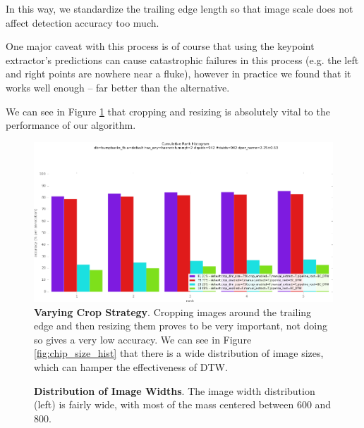 In this way, we standardize the trailing edge length so that image scale does not affect detection accuracy too much.

One major caveat with this process is of course that using the keypoint extractor's predictions can cause catastrophic failures in this process (e.g. the left and right points are nowhere near a fluke), however in practice we found that it works well enough -- far better than the alternative.

We can see in Figure \ref{fig:vary_crop_nocrop} that cropping and resizing is absolutely vital to the performance of our algorithm.

\begin{figure}[t]%
\centering
\includegraphics[width=1\textwidth]{../images/results/vary_crop_nocrop.png}
\caption{\textbf{Varying Crop Strategy}. Cropping images around the trailing edge and then resizing them proves to be very important, not doing so gives a very low accuracy. We can see in Figure \ref{fig:chip_size_hist} that there is a wide distribution of image sizes, which can hamper the effectiveness of DTW.}
\label{fig:vary_crop_nocrop}
\end{figure}

\begin{figure}[t]%
\centering
{}
\caption{\textbf{Distribution of Image Widths}. The image width distribution (left) is fairly wide, with most of the mass centered between 600 and 800.}
\label{fig:width_te_dist}
\end{figure}



